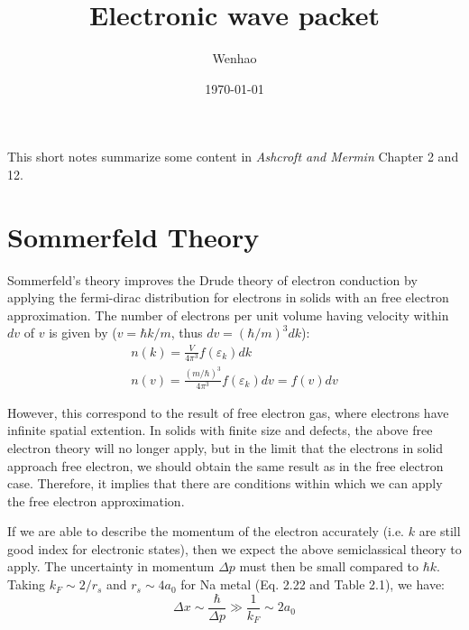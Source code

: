 \documentclass{article}
\begin{document}
\title{Electronic wave packet}
\author{Wenhao}
\date{\today}
\maketitle

This short notes summarize some content in \emph{Ashcroft and Mermin} Chapter 2 and 12.
\section{Sommerfeld Theory}

Sommerfeld's theory improves the Drude theory of electron conduction by applying the fermi-dirac 
distribution for electrons in solids with an free electron approximation. The number of 
electrons per unit volume having velocity within $dv$ of $v$ is given by 
($v = \hbar k/m$, thus $dv = (\hbar/m)^3 dk$):
\begin{gather}
    n(k) = \frac{V}{4\pi^3} f(\varepsilon_k) dk \\
    n(v) = \frac{(m/\hbar)^3}{4\pi^3} f(\varepsilon_k) dv = f(v) dv
\end{gather}

However, this correspond to the result of free electron gas, where electrons have infinite
spatial extention. In solids with finite size and defects, the above free electron theory
will no longer apply, but in the limit that the electrons in solid approach free electron, 
we should obtain the same result as in the free electron case. Therefore, it implies that 
there are conditions within which we can apply the free electron approximation. 

If we are able to describe the momentum of the electron accurately (i.e. $k$ are still good index
for electronic states), then we expect the above semiclassical theory to apply. 
The uncertainty in momentum $\Delta p$ must then be small compared to $\hbar k$. Taking $k_F \sim 2/r_s$
and $r_s \sim 4 a_0$ for Na metal (Eq. 2.22 and Table 2.1),
we have:
\begin{equation}
    \Delta x \sim \frac{\hbar}{\Delta p} \gg \frac{1}{k_F} \sim 2a_0
\end{equation}
\end{document}
